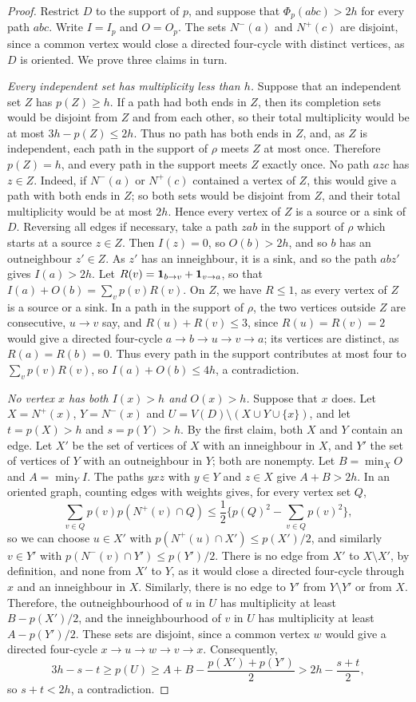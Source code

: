 \begin{proof}
Restrict $D$ to the support of $p$, and suppose that $\Phi_p(abc)>2h$ for
every path $abc$. Write $I=I_p$ and $O=O_p$. The sets $N^-(a)$ and $N^+(c)$ are disjoint, since a common vertex would close a directed four-cycle with distinct vertices, as $D$ is oriented.
We prove three claims in turn.

\emph{Every independent set has multiplicity less than $h$.}
Suppose that an independent set $Z$ has $p(Z)\ge h$. If a path had both ends in $Z$, then its completion sets would be disjoint from $Z$ and from each other, so their total multiplicity would be at most $3h-p(Z)\le2h$. Thus no path has both ends in $Z$, and, as $Z$ is independent, each path in the support of $\rho$ meets $Z$ at most once. Therefore $p(Z)=h$, and every path in the support meets $Z$ exactly once.
No path $azc$ has $z\in Z$. Indeed, if $N^-(a)$ or $N^+(c)$ contained a vertex of $Z$, this would give a path with both ends in $Z$; so both sets would be disjoint from $Z$, and their total multiplicity would be at most $2h$.
Hence every vertex of $Z$ is a source or a sink of $D$. Reversing all edges if necessary, take a path $zab$ in the support of $\rho$ which starts at a source $z\in Z$. Then $I(z)=0$, so $O(b)>2h$, and so $b$ has an outneighbour $z'\in Z$. As $z'$ has an inneighbour, it is a sink, and so the path $abz'$ gives $I(a)>2h$.
Let $R(v)=\mathbf 1_{b\to v}+\mathbf 1_{v\to a}$, so that $I(a)+O(b)=\sum_vp(v)R(v)$. On $Z$, we have $R\le1$, as every vertex of $Z$ is a source or a sink.
In a path in the support of $\rho$, the two vertices outside $Z$ are consecutive, $u\to v$ say, and $R(u)+R(v)\le3$, since $R(u)=R(v)=2$ would give a directed four-cycle $a\to b\to u\to v\to a$; its vertices are distinct, as $R(a)=R(b)=0$. Thus every path in the support contributes at most four to $\sum_vp(v)R(v)$, so $I(a)+O(b)\le4h$, a contradiction.

\emph{No vertex $x$ has both $I(x)>h$ and $O(x)>h$.}
Suppose that $x$ does. Let $X=N^+(x)$, $Y=N^-(x)$ and
$U=V(D)\setminus(X\cup Y\cup\{x\})$, and let $t=p(X)>h$ and $s=p(Y)>h$.
By the first claim, both $X$ and $Y$ contain an edge. Let $X'$ be the set of vertices of $X$
with an inneighbour in $X$, and $Y'$ the set of vertices of $Y$
with an outneighbour in $Y$; both are nonempty. Let $B=\min_XO$ and $A=\min_YI$. The paths $yxz$ with $y\in Y$ and $z\in X$ give $A+B>2h$.
In an oriented graph, counting edges with weights gives, for every vertex set $Q$,
\[
 \sum_{v\in Q}p(v)p(N^+(v)\cap Q)
 \le\frac12\Big\{p(Q)^2-\sum_{v\in Q}p(v)^2\Big\},
\]
so we can choose $u\in X'$ with $p(N^+(u)\cap X')\le p(X')/2$,
and similarly $v\in Y'$ with $p(N^-(v)\cap Y')\le p(Y')/2$.
There is no edge from $X'$ to $X\setminus X'$, by definition,
and none from $X'$ to $Y$, as it would close a directed four-cycle
through $x$ and an inneighbour in $X$. Similarly, there is no edge to $Y'$ from $Y\setminus Y'$ or from $X$.
Therefore, the outneighbourhood of $u$ in $U$ has multiplicity
at least $B-p(X')/2$, and the inneighbourhood of $v$ in $U$ has multiplicity at least $A-p(Y')/2$. These sets are disjoint, since
a common vertex $w$ would give a directed four-cycle $x\to u\to w\to v\to x$.
Consequently,
\[
 3h-s-t\ge p(U)\ge A+B-\frac{p(X')+p(Y')}2>2h-\frac{s+t}2,
\]
so $s+t<2h$, a contradiction.


\end{proof}
